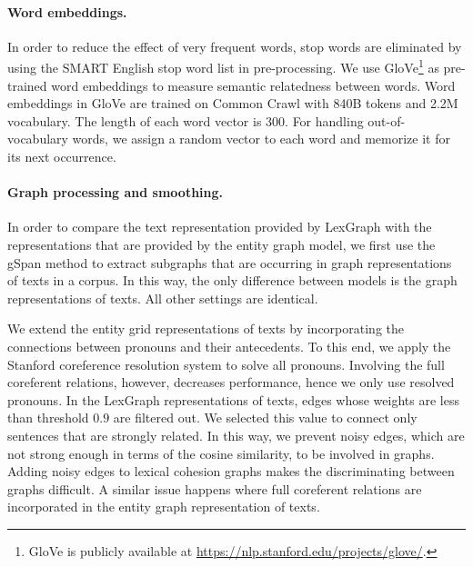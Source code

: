 \paragraph{Word embeddings.}
In order to reduce the effect of very frequent words, stop words are eliminated by using the SMART English stop word list \cite{salton71} in pre-processing.  
We use GloVe\footnote{GloVe is publicly available at \url{https://nlp.stanford.edu/projects/glove/}.} \cite{pennington14} as \mbox{pre-trained} word embeddings to measure semantic relatedness between words. 
Word embeddings in GloVe are trained on Common Crawl with 840B tokens and 2.2M vocabulary. 
The length of each word vector is 300. 
For handling \mbox{out-of-vocabulary} words, we assign a random vector to each word and memorize it for its next occurrence.  

\paragraph{Graph processing and smoothing.} 
In order to compare the text representation provided by LexGraph with the representations that are provided by the entity graph model, we first use the gSpan method \cite{yanxifeng02} to extract subgraphs that are occurring in graph representations of texts in a corpus. 
In this way, the only difference between models is the graph representations of texts. 
All other settings are identical. 

We extend the entity grid representations of texts by incorporating the connections between pronouns and their antecedents. 
To this end, we apply the Stanford coreference resolution system \cite{leeheeyoung13} to solve all pronouns. 
Involving the full coreferent relations, however, decreases performance, hence we only use resolved pronouns. 
In the LexGraph representations of texts, edges whose weights are less than threshold $0.9$ are filtered out. 
We selected this value to connect only sentences that are strongly related. 
In this way, we prevent noisy edges, which are not strong enough in terms of the cosine similarity, to be involved in graphs. 
Adding noisy edges to lexical cohesion graphs makes the discriminating between graphs difficult.
A similar issue happens where full coreferent relations are incorporated in the entity graph representation of texts.   

